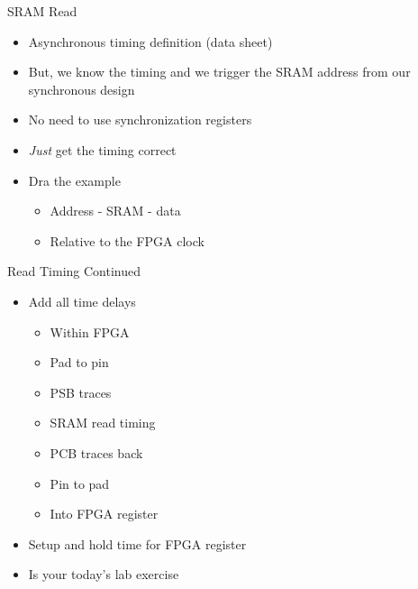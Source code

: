 \begin{frame}[fragile]{SRAM Read}
\begin{itemize}
\item Asynchronous timing definition (data sheet)
\item But, we know the timing and we trigger the SRAM address from
our synchronous design
\item No need to use synchronization registers
\item \emph{Just} get the timing correct
\item Dra the example
\begin{itemize}
\item Address - SRAM - data
\item Relative to the FPGA clock
\end{itemize}
\end{itemize}
\end{frame}

\begin{frame}[fragile]{Read Timing Continued}
\begin{itemize}
\item Add all time delays
\begin{itemize}
\item Within FPGA
\item Pad to pin
\item PSB traces
\item SRAM read timing
\item PCB traces back
\item Pin to pad
\item Into FPGA register
\end{itemize}
\item Setup and hold time for FPGA register
\item Is your today's lab exercise
\end{itemize}
\end{frame}

